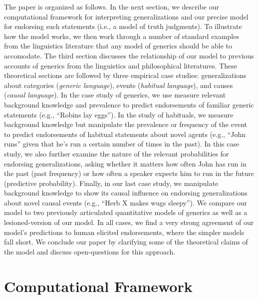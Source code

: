 \documentclass[english,,man,floatsintext]{apa6}
\theoremstyle{definition}
\theoremstyle{definition}
\theoremstyle{definition}
\theoremstyle{remark}
\begin{document}
The paper is organized as follows. In the next section, we describe our
computational framework for interpreting generalizations and our precise
model for endorsing such statements (i.e., a model of truth judgments).
To illustrate how the model works, we then work through a number of
standard examples from the linguistics literature that any model of
generics should be able to accomodate. The third section discusses the
relationship of our model to previous accounts of generics from the
linguistics and philosophical literatures. These theoretical sections
are followed by three empirical case studies: generalizations about
categories (\emph{generic language}), events (\emph{habitual language}),
and causes (\emph{causal language}). In the case study of generics, we
use measure relevant background knowledge and prevalence to predict
endorsements of familiar generic statements (e.g., \enquote{Robins lay
eggs}). In the study of habituals, we measure background knowledge but
manipulate the prevalence or frequency of the event to predict
endorsements of habitual statements about novel agents (e.g.,
\enquote{John runs} given that he's run a certain number of times in the
past). In this case study, we also further examine the nature of the
relevant probabilities for endorsing generalizations, asking whether it
matters how often John has run in the past (past frequency) or how often
a speaker expects him to run in the future (predictive probability).
Finally, in our last case study, we manipulate background knowledge to
show its causal influence on endorsing generalizations about novel
causal events (e.g., \enquote{Herb X makes wugs sleepy}). We compare our
model to two previously articulated quantitative models of generics as
well as a lesioned-version of our model. In all cases, we find a very
strong agreement of our model's predictions to human elicited
endorsements, where the simpler models fall short. We conclude our paper
by clarifying some of the theoretical claims of the model and discuss
open-questions for this approach.

\hypertarget{computational-framework}{%
\section{Computational Framework}\label{computational-framework}}
\end{document}
